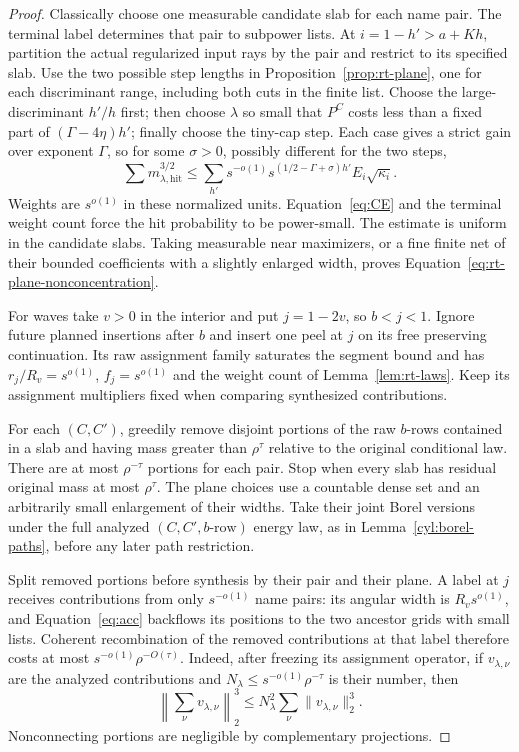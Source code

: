 \begin{proof}
Classically choose one measurable candidate slab for each name pair.
The terminal label determines that pair to subpower lists.
At $i=1-h'>a+Kh$, partition the actual regularized input rays by
the pair and restrict to its specified slab.  Use the two possible
step lengths in Proposition~\ref{prop:rt-plane}, one for each
discriminant range, including both cuts in the finite list.
Choose the large-discriminant $h'/h$ first; then choose $\lambda$
so small that $P^C$ costs less than a fixed part of
$(\Gamma-4\eta)h'$; finally choose the tiny-cap step.
Each case gives a strict gain over exponent $\Gamma$, so for some
$\sigma>0$, possibly different for the two steps,
\[
 \sum m_{\lambda,\mathrm{hit}}^{3/2}
 \le\sum_{h'}s^{-o(1)}
       s^{(1/2-\Gamma+\sigma)h'}E_i\sqrt{\kappa_i}.
\]
Weights are $s^{o(1)}$ in these normalized units.
Equation~\eqref{eq:CE} and the terminal weight count force the hit
probability to be power-small.  The estimate is uniform in the
candidate slabs.  Taking measurable near maximizers, or a fine
finite net of their bounded coefficients with a slightly enlarged
width, proves Equation~\eqref{eq:rt-plane-nonconcentration}.

For waves take $v>0$ in the interior and put $j=1-2v$, so
$b<j<1$.  Ignore future planned insertions after $b$ and insert
one peel at $j$ on its free preserving continuation.  Its raw
assignment family saturates the segment bound and has
$r_j/R_v=s^{o(1)}$, $f_j=s^{o(1)}$ and the weight count of
Lemma~\ref{lem:rt-laws}.  Keep its assignment multipliers fixed
when comparing synthesized contributions.

For each $(C,C')$, greedily remove disjoint portions of the raw
$b$-rows contained in a slab and having mass greater than
$\rho^\tau$ relative to the original conditional law.  There
are at most $\rho^{-\tau}$ portions for each pair.  Stop when
every slab has residual original mass at most $\rho^\tau$.
The plane choices use a countable dense set and an arbitrarily small
enlargement of their widths.  Take their joint Borel versions under
the full analyzed $(C,C',b\text{-row})$ energy law, as in
Lemma~\ref{cyl:borel-paths}, before any later path restriction.

Split removed portions before synthesis by their pair and their
plane.  A label at $j$ receives contributions from only
$s^{-o(1)}$ name pairs: its angular width is $R_vs^{o(1)}$,
and Equation~\eqref{eq:acc} backflows its positions to the two
ancestor grids with small lists.  Coherent recombination of the
removed contributions at that label therefore costs at most
$s^{-o(1)}\rho^{-O(\tau)}$.  Indeed, after freezing its assignment
operator, if $v_{\lambda,\nu}$ are the analyzed contributions and
$N_\lambda\le s^{-o(1)}\rho^{-\tau}$ is their number, then
\[
 \left\|\sum_\nu v_{\lambda,\nu}\right\|_2^3
 \le N_\lambda^2\sum_\nu\|v_{\lambda,\nu}\|_2^3.
\]
Nonconnecting portions are
negligible by complementary projections.


\end{proof}
